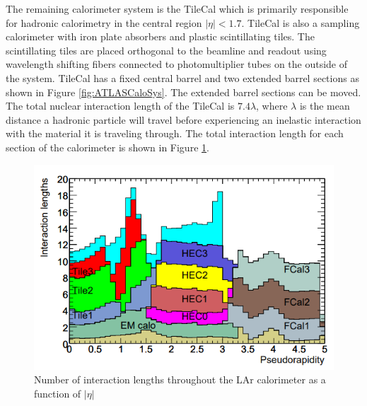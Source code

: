 The remaining calorimeter system is the TileCal which is primarily responsible for hadronic calorimetry in the central region $|\eta|<1.7$.  TileCal is also a sampling calorimeter with iron plate absorbers and plastic scintillating tiles. The scintillating tiles are placed orthogonal to the beamline and readout using wavelength shifting fibers connected to photomultiplier tubes on the outside of the system.  TileCal has a fixed central barrel and two extended barrel sections as shown in Figure \ref{fig:ATLASCaloSys}.  The extended barrel sections can be moved.  The total nuclear interaction length of the TileCal is $7.4\lambda$, where $\lambda$ is the mean distance a hadronic particle will travel before experiencing an inelastic interaction with the material it is traveling through.  The total interaction length for each section of the calorimeter is shown in Figure \ref{fig:InteractionLengths}.


\begin{figure}[h!]
	\centering
	\includegraphics[width=0.8\columnwidth]{../ThesisImages/LHCImages/InteractionLengths.png}
	\caption[Number of interaction lengths throughout the LAr calorimeter as a function of $|\eta|$]{Number of interaction lengths throughout the LAr calorimeter as a function of $|\eta|$
	}
	\label{fig:InteractionLengths}
\end{figure}


